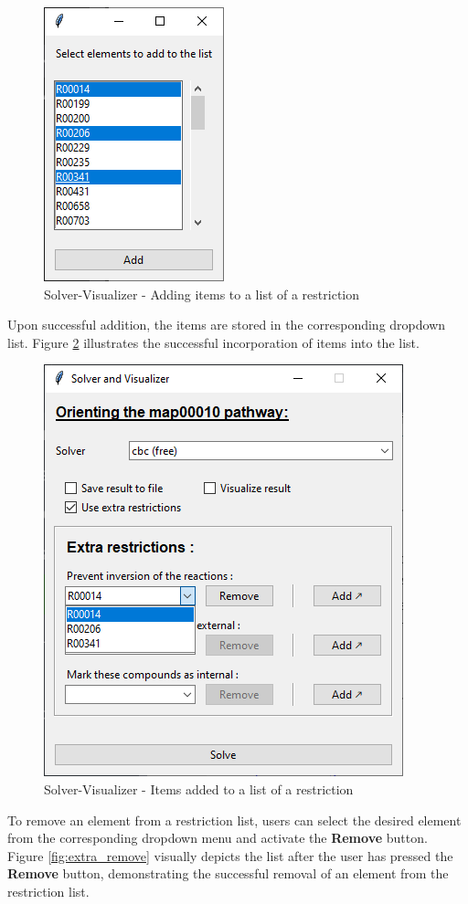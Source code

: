 \begin{figure}[H]
    \centering
    \includegraphics[width=0.35\linewidth]{Design of the User Interface/extra_add.png}
    \caption{Solver-Visualizer - Adding items to a list of a restriction}
    \label{fig:extra_add}
\end{figure}

Upon successful addition, the items are stored in the corresponding dropdown list. Figure \ref{fig:extra_success_add} illustrates the successful incorporation of items into the list.

\begin{figure}[H]
    \centering
    \includegraphics[width=0.5\linewidth]{Design of the User Interface/extra_success_add.png}
    \caption{Solver-Visualizer - Items added to a list of a restriction}
    \label{fig:extra_success_add}
\end{figure}

To remove an element from a restriction list, users can select the desired element from the corresponding dropdown menu and activate the \textbf{Remove} button. Figure \ref{fig:extra_remove} visually depicts the list after the user has pressed the \textbf{Remove} button, demonstrating the successful removal of an element from the restriction list.

